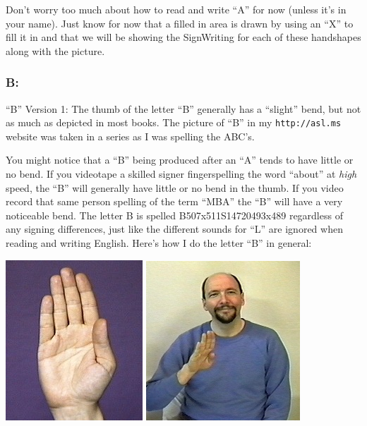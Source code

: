 \documentclass{article}
\begin{document}
Don't worry too much about how to read and write ``A'' for now (unless it's in your name).
Just know for now that a filled in area is drawn by using an ``X'' to fill it in and that we will be showing the SignWriting for each of these handshapes along with the picture.

\subsubsection{B:}

``B'' Version 1:
The thumb of the letter ``B'' generally has a ``slight'' bend, but not as much as depicted in most books.
The picture of ``B'' in my \texttt{http://asl.ms} website was taken in a series as I was spelling the ABC's.

You might notice that a ``B'' being produced after an ``A'' tends to have little or no bend.
If you videotape a skilled signer fingerspelling the word ``about'' at \emph{high} speed, the ``B'' will generally have little or no bend in the thumb.
If you video record that same person spelling of the term ``MBA'' the ``B'' will have a very noticeable bend.
The letter B is spelled B507x511S14720493x489 regardless of any signing differences, just like the different sounds for ``L'' are ignored when reading and writing English.
Here's how I do the letter ``B'' in general:

\includegraphics[scale=0.5]{images/b1.jpg}
\includegraphics[scale=0.5]{images/b.jpg}
\end{document}
